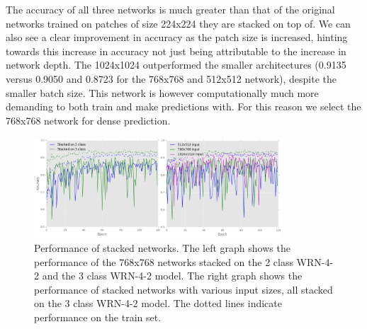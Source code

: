 \documentclass[journal]{IEEEtran}
\begin{document}
The accuracy of all three networks is much greater than that of the original networks trained on patches of size 224x224 they are stacked on top of. We can also see a clear improvement in accuracy as the patch size is 
increased, hinting towards this increase in accuracy not just being attributable to the increase in network depth. The 1024x1024 outperformed the smaller architectures (0.9135 versus 0.9050 and 0.8723 for the 768x768 and 512x512 network), despite the smaller batch size. This network is however computationally much more demanding to both train and make predictions with. For this reason we select the 768x768 network for dense prediction.






\begin{figure}[!t]
\centering{}
\hspace{-0.45cm}\includegraphics[width=3.65in]{768_performance_dual}
\vspace{-0.35cm}\caption{Performance of stacked networks. The left graph shows the performance of the 768x768 networks stacked on the 2 class WRN-4-2 and the 3 class WRN-4-2 model. The right graph shows the performance of stacked networks with various input sizes, all stacked on the 3 class WRN-4-2 model. The dotted lines indicate performance on the train set.}
\label{fig_stack}
\end{figure}



\end{document}
